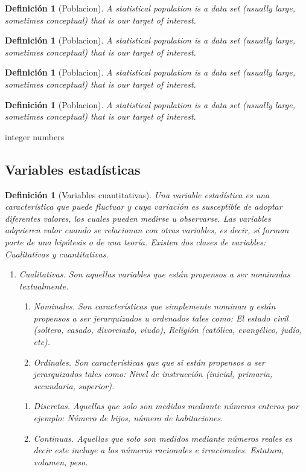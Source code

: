 \documentclass[a4paper]{report}
\newtheorem{defn}[thm]{Definición}
\begin{document}
\begin{defn}[Poblacion]
	A statistical population is a data set (usually large, sometimes conceptual) that is our target of interest.
\end{defn}
\begin{defn}[Poblacion]
	A statistical population is a data set (usually large, sometimes conceptual) that is our target of interest.
\end{defn}
\begin{defn}[Poblacion]
	A statistical population is a data set (usually large, sometimes conceptual) that is our target of interest.
\end{defn}
\begin{defn}[Poblacion]
	A statistical population is a data set (usually large, sometimes conceptual) that is our target of interest.
\end{defn}

integer numbers


\subsection{Variables estadísticas}

\begin{defn}[Variables cuantitativas]
	Una variable estadística es una característica que puede fluctuar y cuya variación es susceptible de adoptar diferentes valores, los cuales pueden medirse u observarse. Las variables adquieren valor cuando se relacionan con otras variables, es decir, si forman parte de una hipótesis o de una teoría. Existen dos clases de variables: Cualitativas y cuantitativas.
	\begin{enumerate}
		\item  Cualitativas. Son aquellas variables que están propensos a ser nominadas textualmente.
			\begin{enumerate}
				\item  Nominales. Son características que simplemente nominan y están propensos a ser jerarquizados u ordenados tales como: El estado   civil (soltero, casado, divorciado, viudo), Religión (católica, evangélico, judío, etc).
				\item  Ordinales. Son características que que si están propensos a ser jerarquizados tales como: Nivel de instrucción (inicial, primaria, secundaria, superior).
			\end{enumerate}
			
			\begin{enumerate}
				\item  Discretas. Aquellas que solo son medidos mediante números enteros por ejemplo: Número de hijos, número de habitaciones.
				\item  Continuas. Aquellas que solo son medidos mediante números reales es decir este incluye a los números racionales e irracionales. Estatura, volumen, peso.
			\end{enumerate}
	\end{enumerate}
\end{defn}
\end{document}
